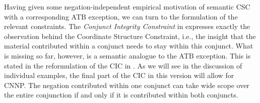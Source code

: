 \documentclass[output=paper]{langsci/langscibook}
\begin{document}


\bigskip%
Having given some negation-independent empirical motivation of semantic CSC with a corresponding ATB exception, we can turn to the formulation of the relevant constraints.
The \emph{Conjunct Integrity Constraint} in 
expresses exactly the observation behind the Coordinate Structure Constraint, i.e., the insight that the material contributed within a conjunct needs to stay within this conjunct. 
What is missing so far, however, is a semantic analogue to the ATB exception. %
This is stated in the reformulation of the CIC in .
As we will see in the discussion of individual examples, the final part of the CIC in this version will allow for CNNP. The negation contributed within one conjunct can take wide scope over the entire conjunction if and only if it is contributed within both conjuncts.


\end{document}
